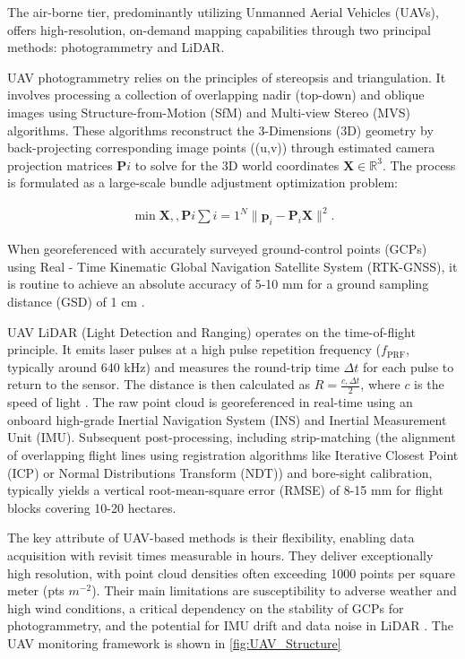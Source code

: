 \documentclass[preprint,11pt,authoryear,3p]{elsarticle}
\begin{document}
The air-borne tier, predominantly utilizing Unmanned Aerial Vehicles (UAVs), offers high-resolution, on-demand mapping capabilities through two principal methods: photogrammetry and LiDAR\citep{yang2022uav}.

UAV photogrammetry relies on the principles of stereopsis and triangulation. It involves processing a collection of overlapping nadir (top-down) and oblique images using Structure-from-Motion (SfM) and Multi-view Stereo (MVS) algorithms. These algorithms reconstruct the 3-Dimensions (3D) geometry by back-projecting corresponding image points ((u,v)) through estimated camera projection matrices $\mathbf{P}i$ to solve for the 3D world coordinates $\mathbf{X} \in \mathbb{R}^3$. The process is formulated as a large-scale bundle adjustment optimization problem:

\begin{align}
    \min{\mathbf{X},,{\mathbf{P}i}}
    \sum{i=1}^{N} \lVert \mathbf{p}_i - \mathbf{P}_i\mathbf{X} \rVert^2.
\end{align}

When georeferenced with accurately surveyed ground-control points (GCPs) using Real - Time Kinematic Global Navigation Satellite System (RTK-GNSS), it is routine to achieve an absolute accuracy of 5-10 mm for a ground sampling distance (GSD) of 1 cm \citep{nwaogu2023application}.

UAV LiDAR (Light Detection and Ranging) operates on the time-of-flight principle. It emits laser pulses at a high pulse repetition frequency ($f_{\text{PRF}}$, typically around 640 kHz) and measures the round-trip time $\Delta t$ for each pulse to return to the sensor. The distance is then calculated as $R = \tfrac{c,\Delta t}{2}$, where $c$ is the speed of light \citep{bao2025monitoring}. The raw point cloud is georeferenced in real-time using an onboard high-grade Inertial Navigation System (INS) and Inertial Measurement Unit (IMU). Subsequent post-processing, including strip-matching (the alignment of overlapping flight lines using registration algorithms like Iterative Closest Point (ICP) or Normal Distributions Transform (NDT)) and bore-sight calibration, typically yields a vertical root-mean-square error (RMSE) of 8-15 mm for flight blocks covering 10-20 hectares\citep{nwaogu2023application}.

The key attribute of UAV-based methods is their flexibility, enabling data acquisition with revisit times measurable in hours. They deliver exceptionally high resolution, with point cloud densities often exceeding 1000 points per square meter (pts $m^{-2}$). Their main limitations are susceptibility to adverse weather and high wind conditions, a critical dependency on the stability of GCPs for photogrammetry, and the potential for IMU drift and data noise in LiDAR \citep{zhang2024situ}. The UAV monitoring framework is shown in \autoref{fig:UAV_Structure}
\end{document}

